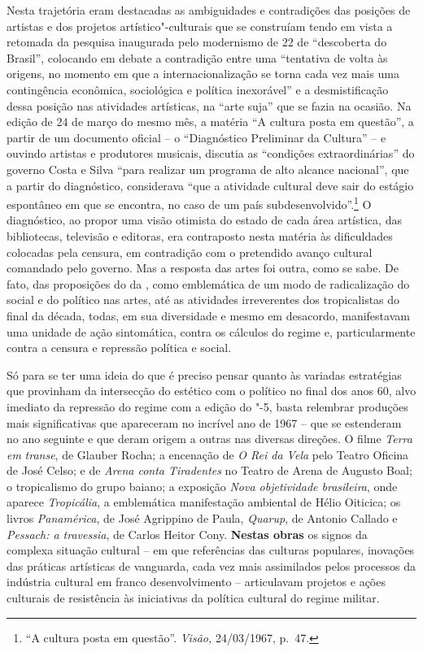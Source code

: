 Nesta trajetória eram destacadas as ambiguidades e contradições das
posições de artistas e dos projetos artístico"-culturais que se
construíam tendo em vista a retomada da pesquisa inaugurada pelo
modernismo de 22 de ``descoberta do Brasil'', colocando em debate a
contradição entre uma ``tentativa de volta às origens, no momento em que
a internacionalização se torna cada vez mais uma contingência econômica,
sociológica e política inexorável'' e a desmistificação dessa posição
nas atividades artísticas, na ``arte suja'' que se fazia na ocasião. Na
edição de 24 de março do mesmo mês, a matéria ``A cultura posta em
questão'', a partir de um documento oficial -- o ``Diagnóstico
Preliminar da Cultura'' -- e ouvindo artistas e produtores musicais,
discutia as ``condições extraordinárias'' do governo Costa e Silva
``para realizar um programa de alto alcance nacional'', que a partir do
diagnóstico, considerava ``que a atividade cultural deve sair do estágio
espontâneo em que se encontra, no caso de um país
subdesenvolvido''.\footnote{``A cultura posta em questão''.
  \emph{Visão,} 24/03/1967, p.~47.} O diagnóstico, ao propor uma visão
otimista do estado de cada área artística, das bibliotecas, televisão e
editoras, era contraposto nesta matéria às dificuldades colocadas pela
censura, em contradição com o pretendido avanço cultural comandado pelo
governo. Mas a resposta das artes foi outra, como se sabe. De fato, das
proposições do  da , como emblemática de um modo de radicalização
do social e do político nas artes, até as atividades irreverentes dos
tropicalistas do final da década, todas, em sua diversidade e mesmo em
desacordo, manifestavam uma unidade de ação sintomática, contra os
cálculos do regime e, particularmente contra a censura e repressão
política e social.

Só para se ter uma ideia do que é preciso pensar quanto às variadas
estratégias que provinham da intersecção do estético com o político no
final dos anos 60, alvo imediato da repressão do regime com a edição do
"-5, basta relembrar produções mais significativas que apareceram no
incrível ano de 1967 -- que se estenderam no ano seguinte e que deram
origem a outras nas diversas direções. O filme \emph{Terra em}
\emph{transe}, de Glauber Rocha; a encenação de \emph{O Rei da Vela}
pelo Teatro Oficina de José Celso; e de \emph{Arena conta Tiradentes} no
Teatro de Arena de Augusto Boal; o tropicalismo do grupo baiano; a
exposição \emph{Nova objetividade brasileira}, onde aparece
\emph{Tropicália}, a emblemática manifestação ambiental de Hélio
Oiticica; os livros \emph{Panamérica}, de José Agrippino de Paula,
\emph{Quarup}, de Antonio Callado e \emph{Pessach: a travessia}, de
Carlos Heitor Cony. \textbf{Nestas obras} os signos da complexa situação
cultural -- em que referências das culturas populares, inovações das
práticas artísticas de vanguarda, cada vez mais assimilados pelos
processos da indústria cultural em franco desenvolvimento -- articulavam
projetos e ações culturais de resistência às iniciativas da política
cultural do regime militar.

